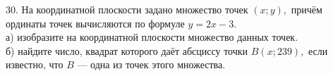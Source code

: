 30. На координатной плоскости задано множество точек $(x;y),$ причём ординаты точек вычисляются по формуле $y=2x-3.$\\
а) изобразите на координатной плоскости множество данных точек.\\
б) найдите число, квадрат которого даёт абсциссу точки $B(x;239),$ если известно, что $B$ --- одна из точек этого множества.\\
